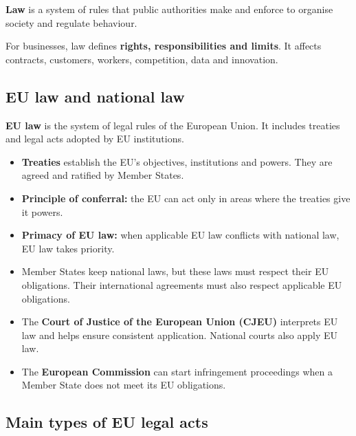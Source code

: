 \documentclass[12pt,a4paper]{report}
\newcommand{\tightlist}{}
\begin{document}
\textbf{Law} is a system of rules that public authorities make and enforce to organise society and regulate behaviour.

For businesses, law defines \textbf{rights, responsibilities and limits}. It affects contracts, customers, workers, competition, data and innovation.

\hypertarget{eu-law-and-national-law}{%
\subsection{EU law and national law}\label{eu-law-and-national-law}}

\textbf{EU law} is the system of legal rules of the European Union. It includes treaties and legal acts adopted by EU institutions.

\begin{itemize}
\tightlist
\item
  \textbf{Treaties} establish the EU's objectives, institutions and powers. They are agreed and ratified by Member States.
\item
  \textbf{Principle of conferral:} the EU can act only in areas where the treaties give it powers.
\item
  \textbf{Primacy of EU law:} when applicable EU law conflicts with national law, EU law takes priority.
\item
  Member States keep national laws, but these laws must respect their EU obligations. Their international agreements must also respect applicable EU obligations.
\item
  The \textbf{Court of Justice of the European Union (CJEU)} interprets EU law and helps ensure consistent application. National courts also apply EU law.
\item
  The \textbf{European Commission} can start infringement proceedings when a Member State does not meet its EU obligations.
\end{itemize}

\hypertarget{main-types-of-eu-legal-acts}{%
\subsection{Main types of EU legal acts}\label{main-types-of-eu-legal-acts}}
\end{document}
